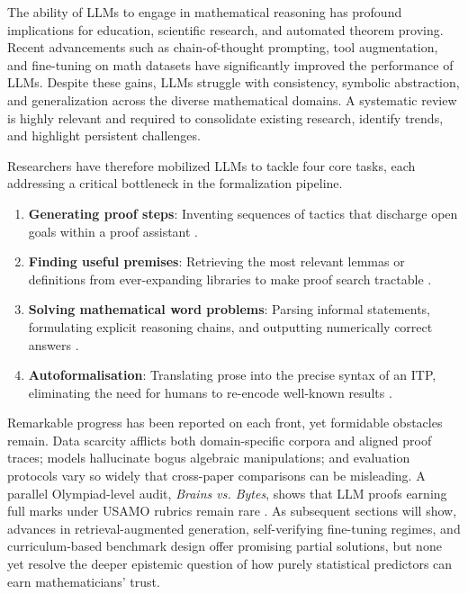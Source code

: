 \documentclass[acmsmall,anonymous]{acmart}
\begin{document}
The ability of LLMs to engage in mathematical reasoning has profound implications for education, scientific research, and automated theorem proving. Recent advancements such as chain-of-thought prompting, tool augmentation, and fine-tuning on math datasets have significantly improved the performance of LLMs. Despite these gains, LLMs struggle with consistency, symbolic abstraction, and generalization across the diverse mathematical domains. A systematic review is highly relevant and required to consolidate existing research, identify trends, and highlight persistent challenges. 

Researchers have therefore mobilized LLMs to tackle four core tasks, each addressing a critical bottleneck in the formalization pipeline.  
\begin{enumerate}
    \item \textbf{Generating proof steps}: Inventing sequences of tactics that discharge open goals within a proof assistant \cite{yang2023subgoalxl,xin2024deepseek,xin2023lego}.  
    \item \textbf{Finding useful premises}: Retrieving the most relevant lemmas or definitions from ever-expanding libraries to make proof search tractable \cite{yang2023leandojo,xin2024deepseek}.  
    \item \textbf{Solving mathematical word problems}: Parsing informal statements, formulating explicit reasoning chains, and outputting numerically correct answers \cite{frieder2023mathematical,chen2022program,gao2022pal,wei2022chain}.  
    \item \textbf{Autoformalisation}: Translating prose into the precise syntax of an ITP, eliminating the need for humans to re-encode well-known results \cite{wang2018first,wu2022autoformalization,murphy2024autoformalizing}.  
\end{enumerate}

Remarkable progress has been reported on each front, yet formidable obstacles remain.  Data scarcity afflicts both domain-specific corpora and aligned proof traces; models hallucinate bogus algebraic manipulations; and evaluation protocols vary so widely that cross-paper comparisons can be misleading. A parallel Olympiad-level audit, \emph{Brains vs. Bytes}, shows that LLM proofs earning full marks under USAMO rubrics remain rare \cite{mahdavi2025brainsvsbytes}.  As subsequent sections will show, advances in retrieval-augmented generation, self-verifying fine-tuning regimes, and curriculum-based benchmark design offer promising partial solutions, but none yet resolve the deeper epistemic question of how purely statistical predictors can earn mathematicians’ trust.
\end{document}
